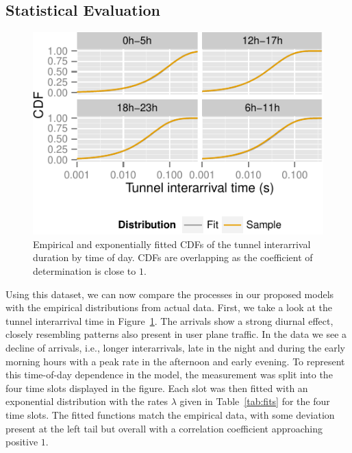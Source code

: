 \subsection{Statistical Evaluation}\label{sec:statistical_evaluation}
\begin{figure}[htbp]
  \centering
  \includegraphics[width=1.0\columnwidth]{figures/R-IAT-active-fit-cdf-facets.pdf}
  \caption{Empirical and exponentially fitted CDFs of the tunnel interarrival duration by time of day. CDFs are overlapping as the coefficient of determination is close to $1$.}
  \label{fig:pdparrivalsecdf}
\end{figure}
Using this dataset, we can now compare the processes in our proposed models with the empirical distributions from actual data. First, we take a look at the tunnel interarrival time in Figure~\ref{fig:pdparrivalsecdf}.
The arrivals show a strong diurnal effect, closely resembling patterns also present in user plane traffic.
In the data we see a decline of arrivals, i.e., longer interarrivals, late in the night and during the early morning hours with a peak rate in the afternoon and early evening.
To represent this time-of-day dependence in the model, the measurement was split into the four time slots displayed in the figure.
Each slot was then fitted with an exponential distribution with the rates $\lambda$ given in Table~\ref{tab:fits} for the four time slots.
The fitted functions match the empirical data, with some deviation present at the left tail but overall with a correlation coefficient approaching positive $1$.
